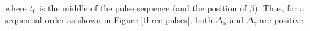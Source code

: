 where $t_0$ is the middle of the pulse sequence (and the position of $\beta$). Thus, for a sequential order as shown in Figure \ref{three pulses}, both $\Delta_\alpha$ and $\Delta_\gamma$ are positive.

